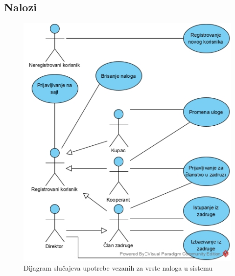 \documentclass[a4paper]{article}
\begin{document}
\subsection{Nalozi}

\begin{figure}[h!]
    \centering
    \includegraphics[scale=0.65]{images/clanstvoSU.jpg}
    \caption{Dijagram slučajeva upotrebe vezanih za vrste naloga u sistemu}
    \label{slika1}
\end{figure}
\end{document}
